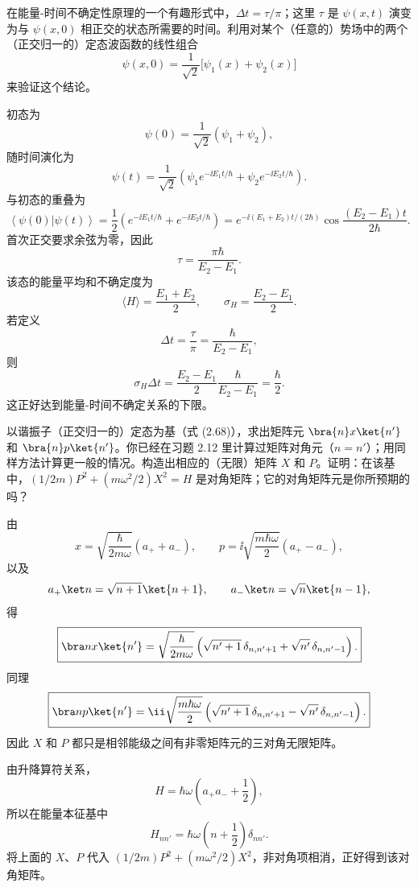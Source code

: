 \begin{question}
在能量-时间不确定性原理的一个有趣形式中，$\Delta t=\tau/\pi$；这里 $\tau$ 是 $\psi(x,t)$ 演变为与 $\psi(x,0)$ 相正交的状态所需要的时间。利用对某个（任意的）势场中的两个（正交归一的）定态波函数的线性组合
\[
\psi(x,0)=\frac{1}{\sqrt2}\bigl[\psi_1(x)+\psi_2(x)\bigr]
\]
来验证这个结论。
\end{question}
\begin{solution}
初态为
\[
\psi(0)=\frac1{\sqrt2}(\psi_1+\psi_2),
\]
随时间演化为
\[
\psi(t)=\frac1{\sqrt2}\left(\psi_1e^{-\ii E_1t/\hbar}
+\psi_2e^{-\ii E_2t/\hbar}\right).
\]
与初态的重叠为
\[
\left\langle \psi(0)|\psi(t) \right\rangle
=\frac12\left(e^{-\ii E_1t/\hbar}+e^{-\ii E_2t/\hbar}\right)
=e^{-\ii(E_1+E_2)t/(2\hbar)}
\cos\frac{(E_2-E_1)t}{2\hbar}.
\]
首次正交要求余弦为零，因此
\[
\tau=\frac{\pi\hbar}{E_2-E_1}.
\]
该态的能量平均和不确定度为
\[
\langle H\rangle=\frac{E_1+E_2}{2},
\qquad
\sigma_H=\frac{E_2-E_1}{2}.
\]
若定义
\[
\Delta t=\frac\tau\pi=\frac{\hbar}{E_2-E_1},
\]
则
\[
\sigma_H\Delta t=\frac{E_2-E_1}{2}\frac{\hbar}{E_2-E_1}=\frac\hbar2.
\]
这正好达到能量-时间不确定关系的下限。
\end{solution}

\begin{question}
以谐振子（正交归一的）定态为基（式 (2.68)），求出矩阵元 $\bra{n}x\ket{n'}$ 和 $\bra{n}p\ket{n'}$。你已经在习题 2.12 里计算过矩阵对角元（$n=n'$）；用同样方法计算更一般的情况。构造出相应的（无限）矩阵 $X$ 和 $P$。证明：在该基中，$(1/2m)P^2+(m\omega^2/2)X^2=H$ 是对角矩阵；它的对角矩阵元是你所预期的吗？

\par\smallskip
{}

\end{question}
\begin{solution}
由
\[
x=\sqrt{\frac{\hbar}{2m\omega}}(a_++a_-),
\qquad
p=\ii\sqrt{\frac{m\hbar\omega}{2}}(a_+-a_-),
\]
以及
\[
a_+\ket n=\sqrt{n+1}\ket{n+1},
\qquad
a_-\ket n=\sqrt n\ket{n-1},
\]
得
\[
\boxed{\bra n x\ket{n'}=\sqrt{\frac{\hbar}{2m\omega}}
\left(\sqrt{n'+1}\,\delta_{n,n'+1}+\sqrt{n'}\,\delta_{n,n'-1}\right).}
\]
同理
\[
\boxed{\bra n p\ket{n'}=\ii\sqrt{\frac{m\hbar\omega}{2}}
\left(\sqrt{n'+1}\,\delta_{n,n'+1}-\sqrt{n'}\,\delta_{n,n'-1}\right).}
\]
因此 $X$ 和 $P$ 都只是相邻能级之间有非零矩阵元的三对角无限矩阵。

由升降算符关系，
\[
H=\hbar\omega\left(a_+a_-+\frac12\right),
\]
所以在能量本征基中
\[
\boxed{H_{nn'}=\hbar\omega\left(n+\frac12\right)\delta_{nn'}.}
\]
将上面的 $X$、$P$ 代入 $(1/2m)P^2+(m\omega^2/2)X^2$，非对角项相消，正好得到该对角矩阵。
\end{solution}

